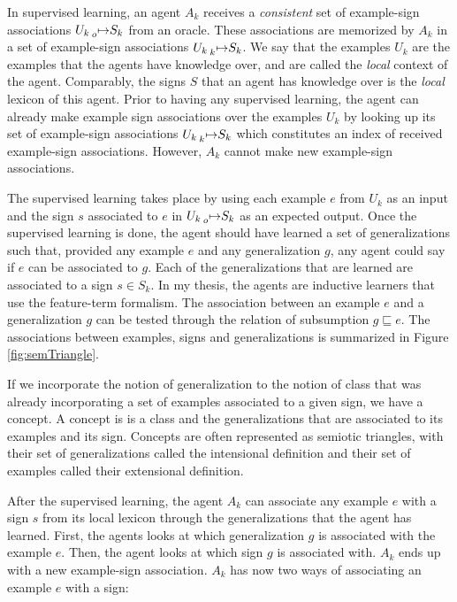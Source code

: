 In supervised learning, an agent $A_{k}$ receives a \emph{consistent} set of example-sign associations $U_{k} \prescript{}{o}{\mapsto} S_{k}$ from an oracle. These associations are memorized by $A_{k}$ in a set of example-sign associations $U_{k} \prescript{}{k}{\mapsto} S_{k}$. We say that the examples $U_{k}$ are the examples that the agents have knowledge over, and are called the \emph{local} context of the agent. Comparably, the signs $S$ that an agent has knowledge over is the \emph{local} lexicon of this agent. Prior to having any supervised learning, the agent can already make example sign associations over the examples $U_{k}$ by looking up its set of example-sign associations $U_{k} \prescript{}{k}{\mapsto} S_{k}$ which constitutes an index of received example-sign associations. However, $A_{k}$ cannot make new example-sign associations.

The supervised learning takes place by using each example $e$ from $U_{k}$ as an input and the sign $s$ associated to $e$ in $U_{k} \prescript{}{o}{\mapsto} S_{k}$ as an expected output. Once the supervised learning is done, the agent should have learned a set of generalizations such that, provided any example $e$ and any generalization $g$, any agent could say if $e$ can be associated to $g$. Each of the generalizations that are learned are associated to a sign $s \in S_{k}$. In my thesis, the agents are inductive learners that use the feature-term formalism. The association between an example $e$ and a generalization $g$ can be tested through the relation of subsumption $g \sqsubseteq e$. The associations between examples, signs and generalizations is summarized in Figure \ref{fig:semTriangle}.

If we incorporate the notion of generalization to the notion of class that was already incorporating a set of examples associated to a given sign, we have a concept. A concept is is a class and the generalizations that are associated to its examples and its sign. Concepts are often represented as semiotic triangles, with their set of generalizations called the intensional definition and their set of examples called their extensional definition.

After the supervised learning, the agent $A_{k}$ can associate any example $e$ with a sign $s$ from its local lexicon through the generalizations that the agent has learned. First, the agents looks at which generalization $g$ is associated with the example $e$. Then, the agent looks at which sign $g$ is associated with. $A_{k}$ ends up with a new example-sign association. $A_{k}$ has now two ways of associating an example $e$ with a sign:

